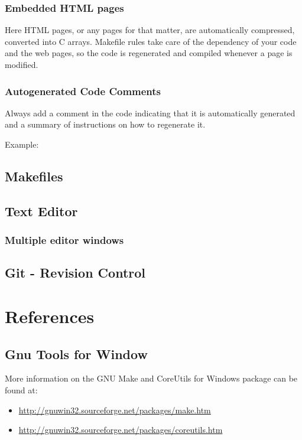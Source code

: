 \subsubsection{Embedded HTML pages}

Here HTML pages, or any pages for that matter, are automatically compressed, converted into C arrays. Makefile rules take care of the dependency of your code and the web pages, so the code is regenerated and compiled whenever a page is modified.


\subsubsection{Autogenerated Code Comments}

Always add a comment in the code indicating that it is automatically generated and a summary of instructions on how to regenerate it.

Example:

\subsection{Makefiles}

\subsection{Text Editor}

\subsubsection{Multiple editor windows}

\subsection{Git - Revision Control}

\section {References}

\subsection {Gnu Tools for Window}

More information on the GNU Make and CoreUtils for Windows package can be found at:

\begin{itemize}
\tightlist
\item
  {\href{http://gnuwin32.sourceforge.net/packages/make.html}{http://gnuwin32.sourceforge.net/packages/make.htm}}
\item
  {\href{http://gnuwin32.sourceforge.net/packages/coreutils.htm}{http://gnuwin32.sourceforge.net/packages/coreutils.htm}}
\end{itemize}

